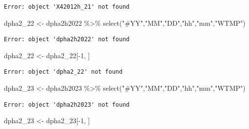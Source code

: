 \documentclass[
  letterpaper,
  DIV=11,
  numbers=noendperiod]{scrreprt}
\newenvironment{Shaded}{\begin{snugshade}}{\end{snugshade}}
\newcommand{\DecValTok}[1]{\textcolor[rgb]{0.68,0.00,0.00}{#1}}
\newcommand{\FunctionTok}[1]{\textcolor[rgb]{0.28,0.35,0.67}{#1}}
\newcommand{\NormalTok}[1]{\textcolor[rgb]{0.00,0.23,0.31}{#1}}
\newcommand{\OtherTok}[1]{\textcolor[rgb]{0.00,0.23,0.31}{#1}}
\newcommand{\SpecialCharTok}[1]{\textcolor[rgb]{0.37,0.37,0.37}{#1}}
\newcommand{\StringTok}[1]{\textcolor[rgb]{0.13,0.47,0.30}{#1}}
\begin{document}
\begin{verbatim}
Error: object 'X42012h_21' not found
\end{verbatim}

\begin{Shaded}
\begin{Highlighting}[]
\NormalTok{dpha2\_22 }\OtherTok{\textless{}{-}}\NormalTok{ dpha2h2022 }\SpecialCharTok{\%\textgreater{}\%} \FunctionTok{select}\NormalTok{(}\StringTok{"\#YY"}\NormalTok{,}\StringTok{"MM"}\NormalTok{,}\StringTok{"DD"}\NormalTok{,}\StringTok{"hh"}\NormalTok{,}\StringTok{"mm"}\NormalTok{,}\StringTok{"WTMP"}\NormalTok{) }
\end{Highlighting}
\end{Shaded}

\begin{verbatim}
Error: object 'dpha2h2022' not found
\end{verbatim}

\begin{Shaded}
\begin{Highlighting}[]
\NormalTok{dpha2\_22 }\OtherTok{\textless{}{-}}\NormalTok{ dpha2\_22[}\SpecialCharTok{{-}}\DecValTok{1}\NormalTok{, ]}
\end{Highlighting}
\end{Shaded}

\begin{verbatim}
Error: object 'dpha2_22' not found
\end{verbatim}

\begin{Shaded}
\begin{Highlighting}[]
\NormalTok{dpha2\_23 }\OtherTok{\textless{}{-}}\NormalTok{ dpha2h2023 }\SpecialCharTok{\%\textgreater{}\%} \FunctionTok{select}\NormalTok{(}\StringTok{"\#YY"}\NormalTok{,}\StringTok{"MM"}\NormalTok{,}\StringTok{"DD"}\NormalTok{,}\StringTok{"hh"}\NormalTok{,}\StringTok{"mm"}\NormalTok{,}\StringTok{"WTMP"}\NormalTok{) }
\end{Highlighting}
\end{Shaded}

\begin{verbatim}
Error: object 'dpha2h2023' not found
\end{verbatim}

\begin{Shaded}
\begin{Highlighting}[]
\NormalTok{dpha2\_23 }\OtherTok{\textless{}{-}}\NormalTok{ dpha2\_23[}\SpecialCharTok{{-}}\DecValTok{1}\NormalTok{, ]}
\end{Highlighting}
\end{Shaded}
\end{document}
